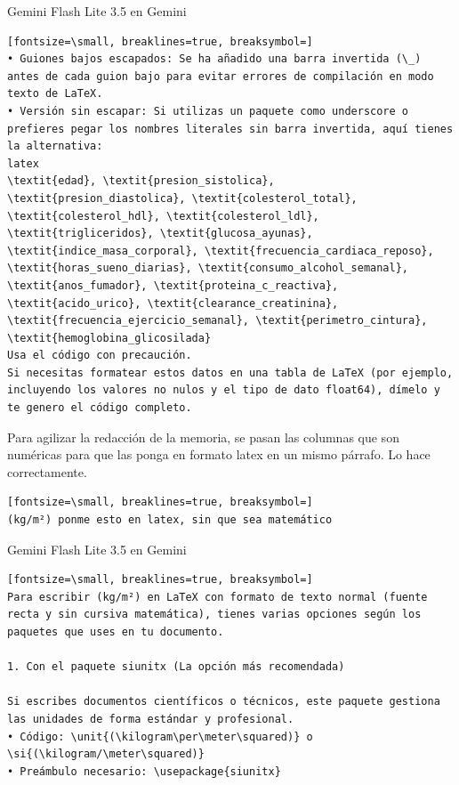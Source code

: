 \documentclass[12pt,a4paper,oneside]{book}
\begin{document}
\begin{iaprompt}
\begin{iaresp}{Gemini Flash Lite 3.5 en Gemini}
\begin{Verbatim}[fontsize=\small, breaklines=true, breaksymbol=]
• Guiones bajos escapados: Se ha añadido una barra invertida (\_) antes de cada guion bajo para evitar errores de compilación en modo texto de LaTeX.
• Versión sin escapar: Si utilizas un paquete como underscore o prefieres pegar los nombres literales sin barra invertida, aquí tienes la alternativa:
latex
\textit{edad}, \textit{presion_sistolica}, \textit{presion_diastolica}, \textit{colesterol_total}, \textit{colesterol_hdl}, \textit{colesterol_ldl}, \textit{trigliceridos}, \textit{glucosa_ayunas}, \textit{indice_masa_corporal}, \textit{frecuencia_cardiaca_reposo}, \textit{horas_sueno_diarias}, \textit{consumo_alcohol_semanal}, \textit{anos_fumador}, \textit{proteina_c_reactiva}, \textit{acido_urico}, \textit{clearance_creatinina}, \textit{frecuencia_ejercicio_semanal}, \textit{perimetro_cintura}, \textit{hemoglobina_glicosilada}
Usa el código con precaución.
Si necesitas formatear estos datos en una tabla de LaTeX (por ejemplo, incluyendo los valores no nulos y el tipo de dato float64), dímelo y te genero el código completo.
\end{Verbatim}
\end{iaresp}
\begin{iaanalisis}
Para agilizar la redacción de la memoria, se pasan las columnas que son numéricas para que las ponga en formato latex en un mismo párrafo. Lo hace correctamente.
\end{iaanalisis}




\begin{iaprompt}
\begin{Verbatim}[fontsize=\small, breaklines=true, breaksymbol=]
(kg/m²) ponme esto en latex, sin que sea matemático
\end{Verbatim}
\end{iaprompt}
\begin{iaresp}{Gemini Flash Lite 3.5 en Gemini}
\begin{Verbatim}[fontsize=\small, breaklines=true, breaksymbol=]
Para escribir (kg/m²) en LaTeX con formato de texto normal (fuente recta y sin cursiva matemática), tienes varias opciones según los paquetes que uses en tu documento.

1. Con el paquete siunitx (La opción más recomendada)

Si escribes documentos científicos o técnicos, este paquete gestiona las unidades de forma estándar y profesional.
• Código: \unit{(\kilogram\per\meter\squared)} o \si{(\kilogram/\meter\squared)}
• Preámbulo necesario: \usepackage{siunitx}


\end{Verbatim}
\end{iaresp}
\end{iaprompt}
\end{document}
